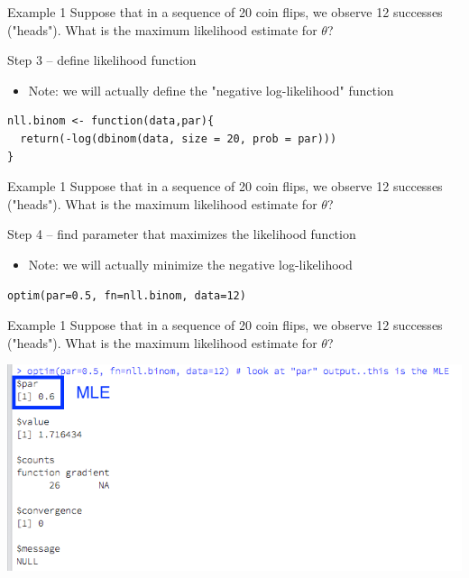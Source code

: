 \documentclass[presentation]{beamer}
\begin{document}
\begin{frame}[fragile,label=sec-14]{Example 1}
 Suppose that in a sequence of 20 coin flips, we observe 12 successes ("heads").  What is the maximum likelihood estimate for $\theta$?

\vspace{5mm}

Step 3 -- define likelihood function
\begin{itemize}
\item Note: we will actually define the "negative log-likelihood" function
\end{itemize}

\begin{verbatim}
nll.binom <- function(data,par){
  return(-log(dbinom(data, size = 20, prob = par)))
}
\end{verbatim}
\end{frame}


\begin{frame}[fragile,label=sec-15]{Example 1}
 Suppose that in a sequence of 20 coin flips, we observe 12 successes ("heads").  What is the maximum likelihood estimate for $\theta$?

\vspace{5mm}

Step 4 -- find parameter that maximizes the likelihood function
\begin{itemize}
\item Note: we will actually \alert{minimize} the negative log-likelihood
\end{itemize}

\begin{verbatim}
optim(par=0.5, fn=nll.binom, data=12)
\end{verbatim}
\end{frame}


\begin{frame}[label=sec-16]{Example 1}
Suppose that in a sequence of 20 coin flips, we observe 12 successes ("heads").  What is the maximum likelihood estimate for $\theta$?

\vspace{5mm}

\includegraphics[width=.9\linewidth]{figures/week2/binomOutput.png}
\end{frame}
\end{document}

